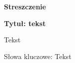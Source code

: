 \thispagestyle{empty}

\begin{po}
	\begin{center}
		\textbf{Streszczenie}
	\end{center}
	\textbf{Tytuł: tekst}
	
	Tekst
	
	Słowa kluczowe: Tekst
\end{po}